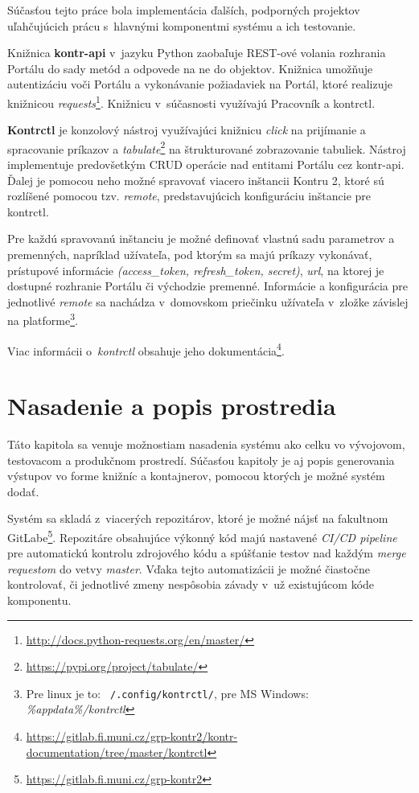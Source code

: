 \documentclass[
  digital, %
  oneside, %
  table,   %
  lof,     %
  lot,   %
]{fithesis3}
\newcommand*{\footurl}[1]{\footnote{\url{#1}}}
\begin{document}
\label{impl-other-parts}
Súčasťou tejto práce bola implementácia ďalších, podporných projektov uľahčujúcich prácu s~hlavnými komponentmi systému a ich testovanie.

Knižnica \textbf{kontr-api} v~jazyku Python zaobaľuje REST-ové volania rozhrania Portálu do sady metód a odpovede na ne do objektov. Knižnica umožňuje autentizáciu voči Portálu a vykonávanie požiadaviek na Portál, ktoré realizuje knižnicou \emph{requests}\footurl{http://docs.python-requests.org/en/master/}. Knižnicu v~súčasnosti využívajú Pracovník a kontrctl. 

\textbf{Kontrctl} je konzolový nástroj využívajúci knižnicu \emph{click} na prijímanie a spracovanie príkazov a \emph{tabulate}\footurl{https://pypi.org/project/tabulate/} na štrukturované zobrazovanie tabuliek. Nástroj implementuje predovšetkým CRUD operácie nad entitami Portálu cez kontr-api. Ďalej je pomocou neho možné spravovať viacero inštancii Kontru 2, ktoré sú rozlíšené pomocou tzv. \emph{remote}, predstavujúcich konfiguráciu inštancie pre kontrctl.

Pre každú spravovanú inštanciu je možné definovať vlastnú sadu parametrov a premenných, napríklad užívateľa, pod ktorým sa majú príkazy vykonávať, prístupové informácie \emph{(access\_token, refresh\_token, secret)}, \emph{url}, na ktorej je dostupné rozhranie Portálu či východzie premenné. Informácie a konfigurácia pre jednotlivé \emph{remote} sa nachádza v~domovskom priečinku užívateľa v~zložke závislej na platforme\footnote{Pre linux je to: \texttt{~/.config/kontrctl/}, pre MS Windows: \emph{\%appdata\%/kontrctl}}.

Viac informácii o~\emph{kontrctl} obsahuje jeho dokumentácia\footnote{\url{https://gitlab.fi.muni.cz/grp-kontr2/kontr-documentation/tree/master/kontrctl}}.

\chapter{Nasadenie a popis prostredia}

Táto kapitola sa venuje možnostiam nasadenia systému ako celku vo vývojovom, testovacom a produkčnom prostredí. Súčasťou kapitoly je aj popis generovania výstupov vo forme knižníc a kontajnerov, pomocou ktorých je možné systém dodať.

Systém sa skladá z~viacerých repozitárov, ktoré je možné nájsť na fakultnom GitLabe\footnote{\url{https://gitlab.fi.muni.cz/grp-kontr2}}. Repozitáre obsahujúce výkonný kód majú nastavené \emph{CI/CD pipeline} pre automatickú kontrolu zdrojového kódu a spúšťanie testov nad každým \emph{merge requestom} do vetvy \emph{master}. Vďaka tejto automatizácii je možné čiastočne kontrolovať, či jednotlivé zmeny nespôsobia závady v~už existujúcom kóde komponentu.
\end{document}
